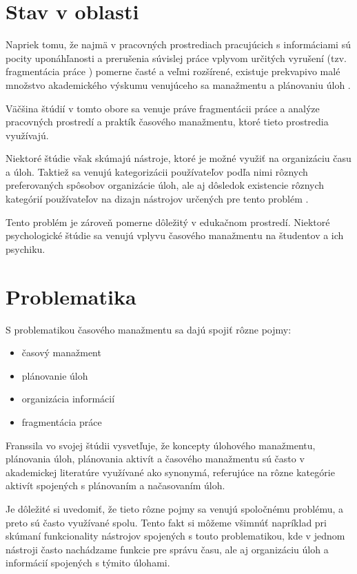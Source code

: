 \documentclass[10pt,slovak,a4paper]{article}
\begin{document}
\section{Stav v oblasti} \label{stav_oblasti}

	Napriek tomu, že najmä v pracovných prostrediach pracujúcich s informáciami sú pocity uponáhľanosti a prerušenia súvislej práce vplyvom určitých vyrušení (tzv. fragmentácia práce \cite{NoTask}) pomerne časté a veľmi rozšírené, existuje prekvapivo malé množstvo akademického výskumu venujúceho sa manažmentu a plánovaniu úloh \cite{Franssila}. 
	
	Väčšina štúdií v tomto obore \cite{Franssila,NoTask,Blandford} sa venuje práve fragmentácii práce a analýze pracovných prostredí a praktík časového manažmentu, ktoré tieto prostredia využívajú.
	
	Niektoré štúdie \cite{Franssila, Blandford, Haraty} však skúmajú nástroje, ktoré je možné využiť na organizáciu času a úloh. Taktiež sa venujú kategorizácii používateľov podľa nimi rôznych preferovaných spôsobov organizácie úloh, ale aj dôsledok existencie rôznych kategórií používateľov na dizajn nástrojov určených pre tento problém \cite{Haraty}.
	
	Tento problém je zároveň pomerne dôležitý v edukačnom prostredí. Niektoré psychologické štúdie \cite{Macan} sa venujú vplyvu časového manažmentu na študentov a ich psychiku.
	
\section{Problematika} \label{problematika}

	S problematikou časového manažmentu sa dajú spojiť rôzne pojmy:
	\begin{itemize}
		\item časový manažment
		\item plánovanie úloh
		\item organizácia informácií
		\item fragmentácia práce
	\end{itemize}

	Franssila vo svojej štúdii\cite{Franssila} vysvetľuje, že koncepty úlohového manažmentu, plánovania úloh, plánovania aktivít a časového manažmentu sú často v akademickej literatúre využívané ako synonymá, referujúce na rôzne kategórie aktivít spojených s plánovaním a načasovaním úloh\cite{Franssila}.
	
	Je dôležité si uvedomiť, že tieto rôzne pojmy sa venujú spoločnému problému, a preto sú často využívané spolu. Tento fakt si môžeme všimnúť napríklad pri skúmaní funkcionality nástrojov spojených s touto problematikou, kde v jednom nástroji často nachádzame funkcie pre správu času, ale aj organizáciu úloh a informácií spojených s týmito úlohami.
	
\end{document}
